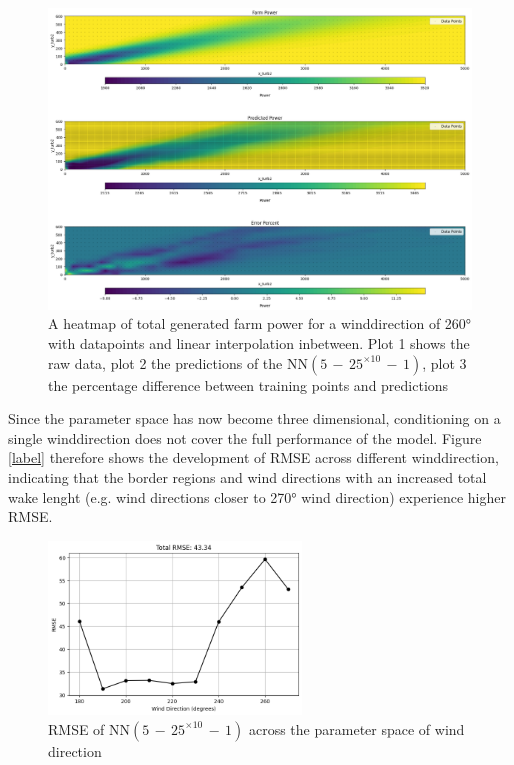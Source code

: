 \begin{figure}[h] 
	\centering
	\includegraphics[width=1\textwidth]{figures/optimization/prob_model_colormap.png} 
	\caption{A heatmap of total generated farm power for a winddirection of 260° with datapoints and linear interpolation inbetween. Plot 1 shows the raw data, plot 2 the predictions of the $\text{NN}(5\,{-}\,25^{\times10}\,{-}\,1)$, plot 3 the percentage difference between training points and predictions }
	\label{fig:prob_model_colormap}
\end{figure}

Since the parameter space has now become three dimensional, conditioning on a single winddirection does not cover the full performance of the model. Figure \ref{label} therefore shows the development of RMSE across different winddirection, indicating that the border regions and wind directions with an increased total wake lenght (e.g. wind directions closer to 270° wind direction) experience higher RMSE. 

\begin{figure}[h] 
	\centering
	\includegraphics[width=0.6\textwidth]{figures/optimization/rmse_dist_10layers25nodes.png}
	\caption{RMSE of  $\text{NN}(5\,{-}\,25^{\times10}\,{-}\,1)$ across the parameter space of wind direction }
	\label{fig:rmse_dist_10layers25nodes}
\end{figure}


